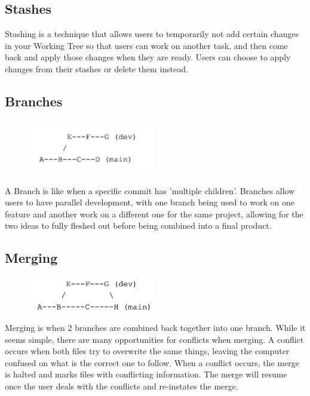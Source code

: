 \documentclass{article}
\begin{document}
\subsection*{Stashes}
Stashing is a technique that allows users to temporarily not add certain changes in your Working Tree so that users can work on another task, and then come back and apply those changes when they are ready. Users can choose to apply changes from their stashes or delete them instead.

\subsection*{Branches}
\begin{figure}[h]
    \centering
    \includegraphics[width=0.5\textwidth]{branch.png}
\end{figure}
A Branch is like when a specific commit has 'multiple children'. Branches allow users to have parallel development, with one branch being used to work on one feature and another work on a different one for the same project, allowing for the two ideas to fully fleshed out before being combined into a final product.
\subsection*{Merging}
\begin{figure}[h]
    \centering
    \includegraphics[width=0.5\textwidth]{Merge.png}
\end{figure}
Merging is when 2 branches are combined back together into one branch. While it seems simple, there are many opportunities for conflicts when merging. A conflict occurs when both files try to overwrite the same things, leaving the computer confused on what is the correct one to follow. When a conflict occurs, the merge is halted and marks files with conflicting information. The merge will resume once the user deals with the conflicts and re-instates the merge. 
\vspace{45pt}
\end{document}
